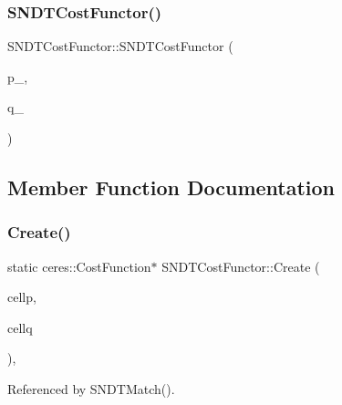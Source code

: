 \subsubsection{\texorpdfstring{S\+N\+D\+T\+Cost\+Functor()}{SNDTCostFunctor()}}
{\footnotesize\ttfamily S\+N\+D\+T\+Cost\+Functor\+::\+S\+N\+D\+T\+Cost\+Functor (\begin{DoxyParamCaption}\item[{const \hyperlink{classSNDTCell}{S\+N\+D\+T\+Cell} $\ast$}]{p\+\_\+,  }\item[{const \hyperlink{classSNDTCell}{S\+N\+D\+T\+Cell} $\ast$}]{q\+\_\+ }\end{DoxyParamCaption})\hspace{0.3cm}{\ttfamily [inline]}}



\subsection{Member Function Documentation}
\mbox{\label{structSNDTCostFunctor_a22ee42d8807a659af32c15d144ed0c6b}} 
\subsubsection{\texorpdfstring{Create()}{Create()}}
{\footnotesize\ttfamily static ceres\+::\+Cost\+Function$\ast$ S\+N\+D\+T\+Cost\+Functor\+::\+Create (\begin{DoxyParamCaption}\item[{const \hyperlink{classSNDTCell}{S\+N\+D\+T\+Cell} $\ast$}]{cellp,  }\item[{const \hyperlink{classSNDTCell}{S\+N\+D\+T\+Cell} $\ast$}]{cellq }\end{DoxyParamCaption})\hspace{0.3cm}{\ttfamily [inline]}, {\ttfamily [static]}}



Referenced by S\+N\+D\+T\+Match().

\mbox{\label{structSNDTCostFunctor_aec08f243fe9582c59c73a0a93a2c0f81}} 
